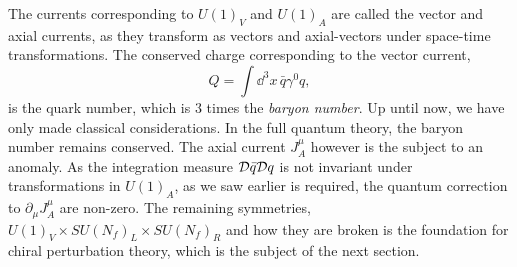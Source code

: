The currents corresponding to $U(1)_V$ and $U(1)_A$ are called the vector and axial currents, as they transform as vectors and axial-vectors under space-time transformations.
The conserved charge corresponding to the vector current,
\begin{equation}
    Q = \int \dd^3 x \, \bar q \gamma^0 q,
\end{equation}
is the quark number, which is $3$ times the \emph{baryon number}.
Up until now, we have only made classical considerations.
In the full quantum theory, the baryon number remains conserved.
The axial current $J^\mu_A$ however is the subject to an anomaly.
As the integration measure $\mathcal{D}\bar q \mathcal{D} q$ is not invariant under transformations in $U(1)_A$, as we saw earlier is required, the quantum correction to $\partial_\mu J^\mu_A$ are non-zero.
The remaining symmetries, $U(1)_V \times SU(N_f)_L \times SU(N_f)_R$ and how they are broken is the foundation for chiral perturbation theory, which is the subject of the next section.
